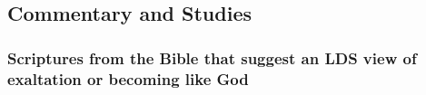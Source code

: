 

	
	
	
	
\subsection{Commentary and Studies} %
	\label{EXALTATION-COMMENTARY}

	
		
	\subsubsection{Scriptures from the Bible that suggest an LDS view of exaltation or becoming like God}
		\label{EXALTATION-study}
		

